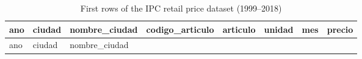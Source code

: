 \documentclass[
  12pt,
]{article}
\begin{document}
\begin{longtable}[]{@{}
  >{\raggedright\arraybackslash}p{}
  >{\raggedright\arraybackslash}p{}
  >{\raggedright\arraybackslash}p{}
  >{\raggedright\arraybackslash}p{}
  >{\raggedright\arraybackslash}p{}
  >{\raggedright\arraybackslash}p{}
  >{\raggedright\arraybackslash}p{}
  >{\raggedright\arraybackslash}p{}@{}}
\caption{First rows of the IPC retail price dataset
(1999--2018)}\tabularnewline
\toprule\noalign{}
\begin{minipage}[b]{\linewidth}\raggedright
ano
\end{minipage} & \begin{minipage}[b]{\linewidth}\raggedright
ciudad
\end{minipage} & \begin{minipage}[b]{\linewidth}\raggedright
nombre\_ciudad
\end{minipage} & \begin{minipage}[b]{\linewidth}\raggedright
codigo\_articulo
\end{minipage} & \begin{minipage}[b]{\linewidth}\raggedright
articulo
\end{minipage} & \begin{minipage}[b]{\linewidth}\raggedright
unidad
\end{minipage} & \begin{minipage}[b]{\linewidth}\raggedright
mes
\end{minipage} & \begin{minipage}[b]{\linewidth}\raggedright
precio
\end{minipage} \\
\midrule\noalign{}
\endfirsthead
\toprule\noalign{}
\begin{minipage}[b]{\linewidth}\raggedright
ano
\end{minipage} & \begin{minipage}[b]{\linewidth}\raggedright
ciudad
\end{minipage} & \begin{minipage}[b]{\linewidth}\raggedright
nombre\_ciudad
\end{minipage} & \begin{minipage}[b]{\linewidth}\raggedright

\end{minipage}
\end{longtable}
\end{document}
